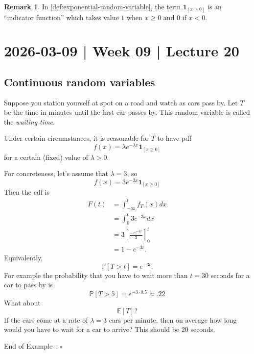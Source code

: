 \documentclass[10pt]{article}
\theoremstyle{definition}
\newtheorem{remark}[theorem]{Remark}
\newtheorem{example}[theorem]{Example}
\renewenvironment{example}
{\begin{oldexample}}
  {\par\smallskip\hfill   End of Example~\theexample. $\square$    \par\end{oldexample}}
\newcommand{\1}[1]{\textbf{1}_{\left[#1\right]}} %
\def\E{\mathbb{E}} %
\def\P{\mathbb{P}} %
\begin{document}
\begin{remark}
  In \cref{def:exponential-random-variable}, the term
  $\mathbf{1}_{\left[ x \geq 0 \right] }$ is an ``indicator function'' which takes value $1$ when
  $x \geq 0$ and $0$ if $x<0$. 
\end{remark}

\newpage
\section{2026-03-09 | Week 09 | Lecture 20}

\subsection{Continuous random variables}
\begin{example}[Waiting times]
  \label{ex:waiting-times}
  Suppose you station yourself at spot on a road and watch as cars pass by. Let $T$ be the time in
  minutes until the first car passes by. This random variable is called the \textit{waiting time}.

  Under certain circumstances, it is reasonable for $T$ to have pdf
  \begin{equation}
    \label{eq:exponential-density}
    f(x) = \lambda e^{-\lambda x}\mathbf{1}_{\left[ x \geq 0 \right] }
  \end{equation}
  for a certain (fixed) value of $\lambda>0$.

  For concreteness, let's assume that $\lambda=3$, so
  \begin{equation*}
    f(x) = 3e^{-3x} \mathbf{1}_{\left[ x \geq 0\right] }
  \end{equation*}
  Then the cdf is
  \begin{align*}
    F(t) 
    &= \int_{-\infty}^{t}f_{T}(x)dx\\
    &= \int_{0}^{t}3 e^{-3 x}dx\\ 
    &=3 \left[ \frac{-e^{-4 x}}{3} \right]^{t}_{0}\\
    &= 1-e^{-3t}.
  \end{align*}
  Equivalently,
  \begin{equation*}
    \P\left[T>t \right] = e^{-3t}.
  \end{equation*}
  For example the probability that you have to wait more than $t=30$ seconds for a car to pass by is
  \begin{equation*}
    \P\left[T>5 \right] = e^{-3\cdot 0.5}\approx .22
  \end{equation*}
  What about
  \begin{equation*}
    \E\left[T \right]?
  \end{equation*}
  If the cars come at a rate of $\lambda=3$ cars per minute, then on average how long would you have to
  wait for a car to arrive? This should be $20$ seconds.


\end{example}
\end{document}
